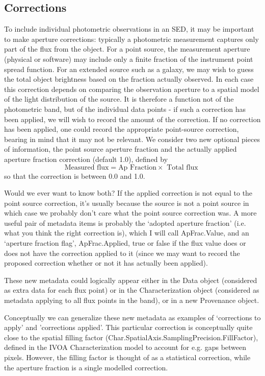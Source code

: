 \documentclass[11pt]{article}
\newcommand{\new}{\color{red}}
\begin{document}
{\new
\subsection{Corrections}

To include individual photometric observations in an SED, it may be important to make
aperture corrections: typically a photometric measurement captures only part of the
flux from the object. For a point source, the measurement aperture (physical or
software) may include only a finite fraction of the instrument point spread function.
For an extended source such as a galaxy, we may wish to guess the total object brightness
based on the fraction actually observed. In each case this correction depends on comparing
the observation aperture to a spatial
model of the light distribution of the source. It is therefore a function not of the photometric
band, but of the individual data points - if such a correction has been applied, we will wish
to record the amount of the correction. If no correction has been applied, one could
record the appropriate point-source correction, bearing in mind that it may not be relevant.
We consider two new optional pieces of information, the point source aperture fraction and
the actually applied aperture fraction correction (default 1.0), defined by
\[ \mbox{Measured flux} = \mbox{Ap Fraction}  \times \mbox{ Total flux } \]
so that the correction is between 0.0 and 1.0.

Would we ever want to know both? If the applied correction is not equal to the point source
correction, it's usually because the source is not a point source in which case we probably
don't care what the point source correction was. A more useful pair of metadata items is probably
the `adopted aperture fraction' (i.e. what you think the right correction is),  which I will
call ApFrac.Value, and an
`aperture fraction flag', ApFrac.Applied, true or false if the flux value does or does not have the correction applied to
it (since we may want to record the proposed correction whether or not it has actually been applied).

These new metadata could logically appear
either in the Data object (considered as extra data for each flux point)
or in the Characterization object (considered as metadata applying to all flux points in the band),
or in a new Provenance object.

Conceptually we can generalize these new metadata as examples of `corrections to apply' and 'corrections applied'.
This particular correction is conceptually quite close to the spatial filling factor
(Char.SpatialAxis.SamplingPrecision.FillFactor), defined in
the IVOA Characterization model to account for e.g. gaps between pixels. However, the filling factor
is thought of as a statistical correction, while the aperture fraction is a single modelled correction.

}
\end{document}
